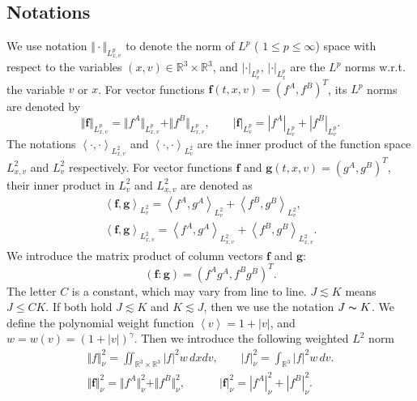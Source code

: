\documentclass[reqno]{amsart}
\numberwithin{equation}{section}
\numberwithin{equation}{section}
\begin{document}
\subsection{Notations}
We use notation $\Vert \cdot\Vert_{L^{p}_{x,v} } $ to denote the norm of $L^p$ ( $1\leq p \leq \infty$) space with respect to the variables $(x,v) \in \mathbb{R}^3  \times \mathbb{R}^3$,  and $| \cdot|_{L^p_v} $, $| \cdot|_{L^p_x} $ are the $L^p$ norms   w.r.t. the variable $v$ or $x$. For vector functions $\mathbf{f}(t,x,v)=(f^A,f^B)^T$, its $L^p$ norms are denoted by
\begin{equation*}
	\Vert \mathbf{f} \Vert_{L^{p}_{x,v}}=\Vert f^A\Vert_{L^{p}_{x,v}}+\Vert f^B \Vert_{L^{p}_{x,v}},\qquad | \mathbf{f} |_{L^{p}_{v}}=| f^A|_{L^{p}_{v}}+| f^B|_{L^{p}_{v}}.
\end{equation*}
The notations  $\left \langle \cdot, \cdot	\right \rangle_{L^{2}_{x,v}}$ and $\left\langle \cdot, \cdot\right \rangle_{L^{2}_{v}}$ are the inner product of the function space $L^2_{x,v}$ and $L^2_{v}$ respectively. For vector functions $\mathbf{f}$ and $\mathbf{g}(t,x,v)=(g^A,g^B)^T$,  their inner product in $L^2_v$ and $L^2_{x,v}$ are denoted as 
\begin{gather*}
	\left \langle \mathbf{f}, \mathbf{g}\right \rangle_{L^{2}_{v}} = \left \langle f^A, g^A	\right \rangle_{L^{2}_{v}} + \left \langle f^B, g^B	\right \rangle_{L^{2}_{v}}, \\
	\left \langle \mathbf{f}, \mathbf{g}\right \rangle_{L^{2}_{x,v}} = \left \langle f^A, g^A	\right \rangle_{L^{2}_{x,v}} + \left \langle f^B, g^B	\right \rangle_{{L^{2}_{x,v}}}.
\end{gather*}
We introduce the matrix product of column vectors $\mathbf{f}$ and $\mathbf{g}$:
\begin{equation*}
	(\mathbf{f}:\mathbf{g})=(f^Ag^A,f^Bg^B)^T.
\end{equation*} 
The letter $C$ is a constant, which may vary from line to line. $J \lesssim K$ means $J \leq C K$. If both hold $J \lesssim K$ and $K \lesssim J$, then we use the notation $J\thicksim K$. 
We define the polynomial weight function $\left \langle v \right\rangle= 1+|v|$, and $w=w(v)=(1+|v|)^{\gamma}$. Then we introduce the following weighted $L^2$ norm
\begin{gather*}
	\Vert f \Vert_{\nu}^2 = \iint_{\mathbb{R}^3 \times \mathbb{R}^3} |f|^2 w \,dxdv, \qquad  | f |_{\nu}^2 = \int_{\mathbb{R}^3 } |f|^2 w \,dv.\\
	\Vert \mathbf{f} \Vert_{\nu}^2 = \Vert f^A \Vert_{\nu}^2 +\Vert f^B \Vert_{\nu}^2 , \quad \quad \quad  | \mathbf{f} |_{\nu}^2 =| f^A |_{\nu}^2 +| f^B |_{\nu}^2.
\end{gather*}
\end{document}
